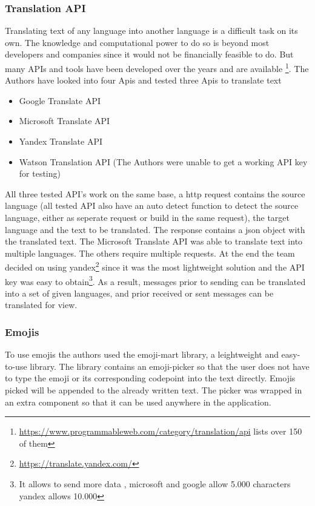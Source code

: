 \setcounter{footnote}{0}
\subsubsection{Translation API}
Translating text of any language into another language is a difficult task on its own. The knowledge and computational power to do so is beyond most developers and companies since it would not be financially feasible to do. But many APIs and tools have been developed over the years and are available \footnote{\url{https://www.programmableweb.com/category/translation/api} lists over 150 of them}. The Authors have looked into four Apis and tested three Apis to translate text
\begin{itemize}
	\item Google Translate API 
	\item Microsoft Translate API
	\item Yandex Translate API
	\item Watson Translation API (The Authors were unable to get a working API key for testing)
\end{itemize}

All three tested API’s work on the same base, a http request contains the source language (all tested API also have an auto detect function to detect the source language, either as seperate request or build in the same request), the target language and the text to be translated. The response contains a json object with the translated text. The Microsoft Translate API was able to translate text into multiple languages. The others require multiple requests. At the end the team decided on using yandex\footnote{\url{https://translate.yandex.com/}} since it was the most lightweight solution and the API key was easy to obtain\footnote{It allows to send more data , microsoft and google allow 5.000 characters yandex allows 10.000}.
As a result, messages prior to sending can be translated into a set of given languages, and prior received or sent messages can be translated for view.
\subsubsection{Emojis}
To use emojis the authors used the emoji-mart library, a leightweight and easy-to-use library. The library contains an emoji-picker so that the user does not have to type the emoji or its corresponding codepoint into the text directly. Emojis picked will be appended to the already written text. The picker was wrapped in an extra component so that it can be used anywhere in the application.

